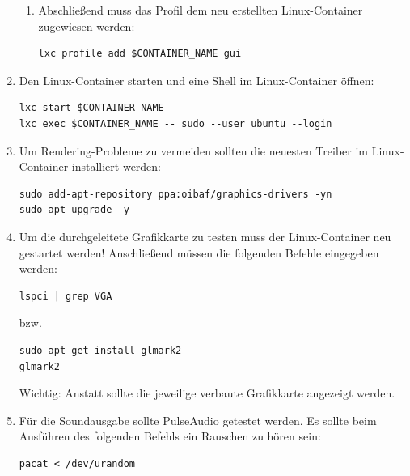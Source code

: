\begin{enumerate}[label*=\arabic*.]
\begin{enumerate}[label*=\arabic*.]
                \item Abschließend muss das Profil dem neu erstellten Linux-Container zugewiesen werden:
                    \begin{lstlisting}[style=bash]
lxc profile add $CONTAINER_NAME gui
                    \end{lstlisting}
        \end{enumerate}


    \item Den Linux-Container starten und eine Shell im Linux-Container öffnen:
        \begin{lstlisting}[style=bash]
lxc start $CONTAINER_NAME
lxc exec $CONTAINER_NAME -- sudo --user ubuntu --login
        \end{lstlisting}

    \item Um Rendering-Probleme zu vermeiden sollten die neuesten Treiber im Linux-Container installiert werden:
        \begin{lstlisting}[style=bash]
sudo add-apt-repository ppa:oibaf/graphics-drivers -yn
sudo apt upgrade -y
        \end{lstlisting}

    \item Um die durchgeleitete Grafikkarte zu testen muss der Linux-Container neu gestartet werden! Anschließend müssen die folgenden Befehle eingegeben werden:
        \begin{lstlisting}[style=bash]
lspci | grep VGA
        \end{lstlisting}
        bzw.
        \begin{lstlisting}[style=bash]
sudo apt-get install glmark2
glmark2
        \end{lstlisting}

        \begin{redbox}{Wichtig:}
            Anstatt  sollte die jeweilige verbaute Grafikkarte angezeigt werden.
        \end{redbox}

    \item Für die Soundausgabe sollte PulseAudio getestet werden. Es sollte beim Ausführen des folgenden Befehls ein Rauschen zu hören sein:
        \begin{lstlisting}[style=bash]
pacat < /dev/urandom
        \end{lstlisting}


\end{enumerate}
